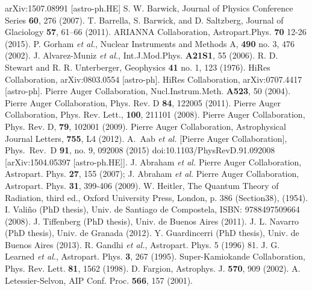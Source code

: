 \begin{thebibliography}{1}
 arXiv:1507.08991 [astro-ph.HE]
 S. W. Barwick, Journal of Physics Conference Series \textbf{60}, 276 (2007).
  T. Barrella, S. Barwick, and D. Saltzberg, Journal of Glaciology \textbf{57}, 61–66 (2011).
 ARIANNA Collaboration, Astropart.Phys. \textbf{70} 12-26 (2015).
  P. Gorham {\it et al.}, Nuclear Instruments and Methods A, \textbf{490} no. 3,  476 (2002).
 J. Alvarez-Muniz {\it et al.}, Int.J.Mod.Phys. \textbf{A21S1}, 55 (2006).
 R. D. Stewart and R. R. Unterberger, Geophysics \textbf{41} no. 1, 123 (1976).
 HiRes Collaboration, arXiv:0803.0554 [astro-ph].
 HiRes Collaboration, arXiv:0707.4417 [astro-ph].
 Pierre Auger Collaboration, Nucl.Instrum.Meth. \textbf{A523},  50 (2004).
 Pierre Auger Collaboration, Phys. Rev. D \textbf{84}, 122005 (2011).
 Pierre Auger Collaboration, Phys. Rev. Lett., \textbf{100}, 211101 (2008).
 Pierre Auger Collaboration, Phys. Rev. D, \textbf{79}, 102001 (2009).
 Pierre Auger Collaboration, Astrophysical Journal Letters, \textbf{755}, L4 (2012).
 A.~Aab {\it et al.} [Pierre Auger Collaboration], Phys.\ Rev.\ D {\bf 91}, no. 9, 092008 (2015) doi:10.1103/PhysRevD.91.092008 [arXiv:1504.05397 [astro-ph.HE]].
J. Abraham {\it et al.} Pierre Auger Collaboration, Astropart. Phys. \textbf{27}, 155 (2007);
J. Abraham {\it et al.} Pierre Auger Collaboration, Astropart. Phys. {\bf 31}, 399-406 (2009).
 W. Heitler, The Quantum Theory of Radiation, third ed., Oxford University Press, London, p. 386 (Section38), (1954).
 I. Vali\~no (PhD thesis), Univ. de Santiago de Compostela, ISBN: 9788497509664 (2008).
 J. Tiffenberg (PhD thesis), Univ. de Buenos Aires (2011).
 J. L. Navarro (PhD thesis), Univ. de Granada (2012).
 Y. Guardincerri (PhD thesis), Univ. de Buenos Aires (2013).
 R. Gandhi {\it et al.}, Astropart. Phys. 5 (1996) 81.
 J. G. Learned {\it et al.}, Astropart. Phys. \textbf{3}, 267 (1995).
 Super-Kamiokande Collaboration, Phys. Rev. Lett. \textbf{81}, 1562 (1998). 
 D. Fargion, Astrophys. J. \textbf{570}, 909 (2002).
 A. Letessier-Selvon, AIP Conf. Proc. \textbf{566}, 157 (2001).

\end{thebibliography}
